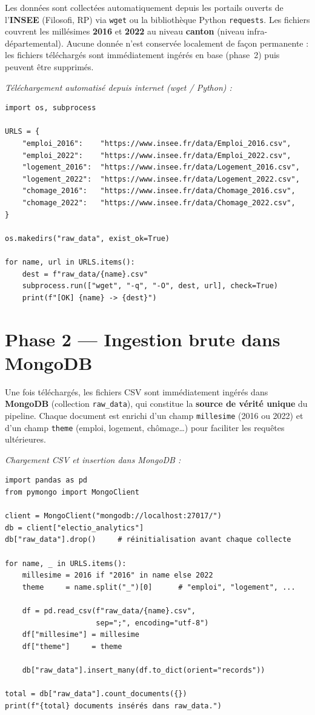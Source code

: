 Les données sont collectées automatiquement depuis les portails ouverts de l'\textbf{INSEE}
(Filosofi, RP) via \texttt{wget} ou la bibliothèque Python \texttt{requests}.
Les fichiers couvrent les millésimes \textbf{2016} et \textbf{2022}
au niveau \textbf{canton} (niveau infra-départemental).
Aucune donnée n'est conservée localement de façon permanente : les fichiers
téléchargés sont immédiatement ingérés en base (phase~2) puis peuvent être supprimés.

\medskip\noindent\textit{Téléchargement automatisé depuis internet (wget / Python) :}
\begin{verbatim}
import os, subprocess

URLS = {
    "emploi_2016":    "https://www.insee.fr/data/Emploi_2016.csv",
    "emploi_2022":    "https://www.insee.fr/data/Emploi_2022.csv",
    "logement_2016":  "https://www.insee.fr/data/Logement_2016.csv",
    "logement_2022":  "https://www.insee.fr/data/Logement_2022.csv",
    "chomage_2016":   "https://www.insee.fr/data/Chomage_2016.csv",
    "chomage_2022":   "https://www.insee.fr/data/Chomage_2022.csv",
}

os.makedirs("raw_data", exist_ok=True)

for name, url in URLS.items():
    dest = f"raw_data/{name}.csv"
    subprocess.run(["wget", "-q", "-O", dest, url], check=True)
    print(f"[OK] {name} -> {dest}")
\end{verbatim}

\section{Phase 2 --- Ingestion brute dans MongoDB}

Une fois téléchargés, les fichiers CSV sont immédiatement ingérés dans
\textbf{MongoDB} (collection \texttt{raw\_data}), qui constitue la
\textbf{source de vérité unique} du pipeline.
Chaque document est enrichi d'un champ \texttt{millesime} (2016 ou 2022)
et d'un champ \texttt{theme} (emploi, logement, chômage\ldots) pour faciliter
les requêtes ultérieures.

\medskip\noindent\textit{Chargement CSV et insertion dans MongoDB :}
\begin{verbatim}
import pandas as pd
from pymongo import MongoClient

client = MongoClient("mongodb://localhost:27017/")
db = client["electio_analytics"]
db["raw_data"].drop()     # réinitialisation avant chaque collecte

for name, _ in URLS.items():
    millesime = 2016 if "2016" in name else 2022
    theme     = name.split("_")[0]      # "emploi", "logement", ...

    df = pd.read_csv(f"raw_data/{name}.csv",
                     sep=";", encoding="utf-8")
    df["millesime"] = millesime
    df["theme"]     = theme

    db["raw_data"].insert_many(df.to_dict(orient="records"))

total = db["raw_data"].count_documents({})
print(f"{total} documents insérés dans raw_data.")
\end{verbatim}

